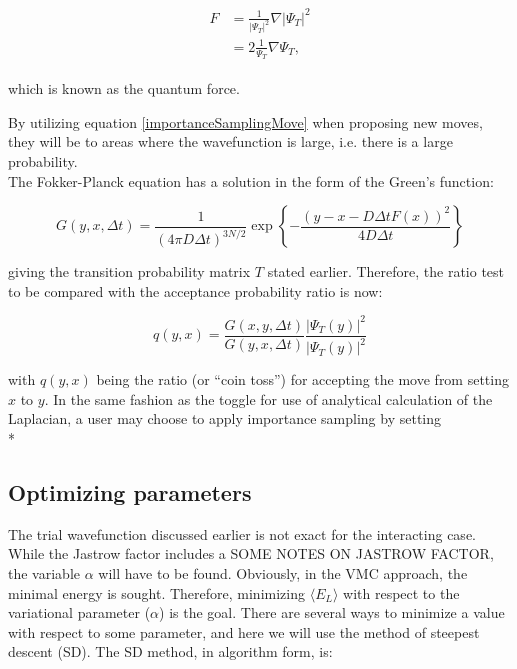 \documentclass[english, a4paper]{article}
\begin{document}
\begin{align}
	\begin{split}
	F &= \frac{1}{|\Psi_T|^2}\nabla|\Psi_T|^2\\
	&= 2\frac{1}{\Psi_T}\nabla\Psi_T,
	\end{split}
\end{align}

which is known as the quantum force.

By utilizing equation \eqref{importanceSamplingMove} when proposing new moves, they will be to areas where the wavefunction is large, i.e. there is a large probability.\\
The Fokker-Planck equation has a solution in the form of the Green's function:

\begin{equation}
 G(y,x,\Delta t) = \frac{1}{(4\pi D\Delta t)^{3N/2}}\exp\left\{-\frac{(y-x-D\Delta tF(x))^2}{4D\Delta t}\right\}
\end{equation}

giving the transition probability matrix $T$ stated earlier. Therefore, the ratio test to be compared with the acceptance probability ratio is now:

\begin{equation}
 q(y,x) = \frac{G(x,y,\Delta t)}{G(y,x,\Delta t)}\frac{|\Psi_T(y)|^2}{|\Psi_T(y)|^2}
\end{equation}

with $q(y,x)$ being the ratio (or ``coin toss'') for accepting the move from setting $x$ to $y$.
In the same fashion as the toggle for use of analytical calculation of the Laplacian, a user may choose to apply importance sampling by setting 
\\*



\subsection{Optimizing parameters}
The trial wavefunction discussed earlier is not exact for the interacting case. While the Jastrow factor includes a SOME NOTES ON JASTROW FACTOR, the variable $\alpha$ will have to be found.
Obviously, in the VMC approach, the minimal energy is sought. Therefore, minimizing $\langle E_L\rangle$ with respect to the variational parameter ($\alpha$) is the goal.
There are several ways to minimize a value with respect to some parameter, and here we will use the method of steepest descent (SD). The SD method, in algorithm form, is:
\end{document}

